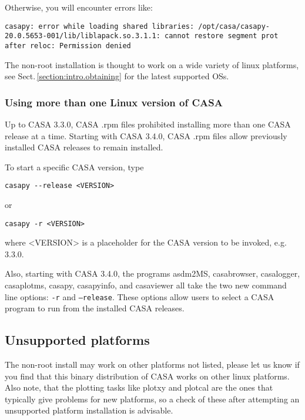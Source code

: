 Otherwise, you will encounter errors like:


\small
\begin{verbatim}
casapy: error while loading shared libraries: /opt/casa/casapy-20.0.5653-001/lib/liblapack.so.3.1.1: cannot restore segment prot after reloc: Permission denied
\end{verbatim}
\normalsize

The non-root installation is thought to work on a wide variety of
linux platforms, see Sect.\,\ref{section:intro.obtaining} for the
latest supported OSs.

\subsubsection{Using more than one Linux version of CASA}
Up to CASA 3.3.0, CASA .rpm files prohibited installing more than one CASA release at a time.  Starting with CASA 3.4.0, CASA .rpm files allow previously installed CASA releases to remain installed.  

To start a specific CASA version, type 

\small
\begin{verbatim}
casapy --release <VERSION>
\end{verbatim}
\normalsize
or 
\small
\begin{verbatim}
casapy -r <VERSION>
\end{verbatim}
\normalsize

where <VERSION> is a placeholder for the CASA version to be invoked, e.g. 3.3.0. 

Also, starting with CASA 3.4.0, the programs asdm2MS, casabrowser,
casalogger, casaplotms, casapy, casapyinfo, and casaviewer all take
the two new command line options: {\tt -r} and {\tt --release}.  These options
allow users to select a CASA program to run from the installed CASA
releases.




\subsection{Unsupported platforms}

The non-root install may work on other platforms not listed, please
let us know if you find that this binary distribution of CASA works on
other linux platforms. Also note, that the plotting tasks like plotxy
and plotcal are the ones that typically give problems for new
platforms, so a check of these after attempting an unsupported
platform installation is advisable.


